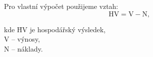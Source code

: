\documentclass{article}
\begin{document}
\noindent
Pro vlastní výpočet použijeme vztah:
$$\mbox{HV} = \mbox{V} - \mbox{N},$$

\begin{tabbing}
kde \=HV je hospodářský výsledek,\\
\>V -- výnosy,\\
\>N -- náklady.\\
\end{tabbing}
\end{document}

